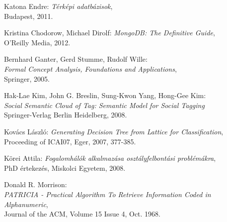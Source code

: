 \begin{thebibliography}{9}



Katona Endre: \emph{Térképi adatbázisok},\\
Budapest, 2011.

Kristina Chodorow, Michael Dirolf: \emph{MongoDB: The Definitive Guide}, \\
O'Reilly Media, 2012.

Bernhard Ganter, Gerd Stumme, Rudolf Wille:\\
\emph{Formal Concept Analysis, Foundations and Applications},\\
Springer, 2005.

Hak-Lae Kim, John G. Breslin, Sung-Kwon Yang, Hong-Gee Kim: \\
\emph{Social Semantic Cloud of Tag: Semantic Model for Social Tagging} \\
Springer-Verlag Berlin Heidelberg, 2008.

Kovács László: \emph{Generating Decision Tree from Lattice for Classification}, \\
Proceeding of ICAI07, Eger, 2007, 377-385.

Körei Attila: \textit{Fogalomhálók alkalmazása osztályfelbontási problémákra}, \\
PhD értekezés, Miskolci Egyetem, 2008.

Donald R. Morrison: \\
\textit{PATRICIA - Practical Algorithm To Retrieve Information Coded in Alphanumeric}, \\
Journal of the ACM, Volume 15 Issue 4, Oct. 1968.


\end{thebibliography}

